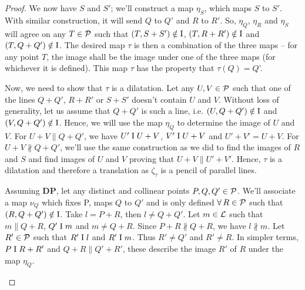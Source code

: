 \begin{proof}
    We now have $S$ and $S'$; we'll construct a map $\eta_S$, which maps $S$ to $S'.$ With similar construction, it will send $Q$ to $Q'$ and $R$ to $R'$. So, $\eta_Q$, $\eta_R$ and $\eta_S$ will agree on any $T \in \mathcal{P}$ such that $(T, S+S') \notin \text{I}$, $(T, R+R') \notin \text{I}$ and $(T, Q+Q') \notin \text{I}$. The desired map $\tau$ is then a combination of the three maps -- for any point $T$, the image shall be the image under one of the three maps (for whichever it is defined). This map $\tau$ has the property that $\tau(Q) = Q$'.
    
    Now, we need to show that $\tau$ is a dilatation. Let any $U,V \in \mathcal{P}$ such that one of the lines $Q+Q'$, $R+R'$ or $S+S'$ doesn't contain $U$ and $V$. Without loss of generality, let us assume that $Q+Q'$ is such a line, i.e. $(U,Q+Q') \notin \text{I}$ and $(V, Q+Q') \notin \text{I}$. Hence, we will use the map $\eta_Q$ to determine the image of $U$ and $V$. For $U+V \parallel Q+Q'$, we have $U' \mathrel\text{I} U+V$, $V' \mathrel\text{I} U+V$ and  $U'+V'=U+V$. For $U+V \not\parallel Q+Q'$, we'll use the same construction as we did to find the images of $R$ and $S$ and find images of $U$ and $V$ proving that $U+V \parallel U'+V'$. Hence, $\tau$ is a dilatation and therefore a translation as $\zeta_\tau$ is a pencil of parallel lines.

    Assuming $\mathbf{DP}$, let any distinct and collinear points $P,Q,Q' \in \mathcal{P}$. We'll associate a map $\nu_Q$ which fixes P, maps $Q$ to $Q'$ and is only defined $\forall\, R \in \mathcal{P}$ such that $(R,Q+Q') \notin \text{I}$. Take $l=P+R$, then $l \neq Q+Q'$. Let $m \in \mathcal{L}$ such that $m \parallel Q+R$, $Q' \mathrel\text{I} m$ and $m \neq Q+R$. Since $P+R \not \parallel Q+R$, we have $l \not \parallel m$. Let $R' \in \mathcal{P}$ such that $R' \mathrel\text{I} l$ and $R' \mathrel\text{I} m$. Thus $R' \neq Q'$ and $R' \neq R$. In simpler terms, $P \mathrel\text{I} R+R'$ and $Q+R \parallel Q' + R'$, these describe the image $R'$ of $R$ under the map $\eta_Q.$

    \begin{center}
    \end{center}


\end{proof}
